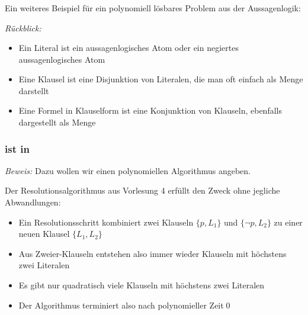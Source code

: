 \documentclass[aspectratio=1610,onlymath]{beamer}
\begin{document}
\begin{frame}\frametitle{}

Ein weiteres Beispiel für ein polynomiell lösbares Problem aus der Aussagenlogik:
\bigskip

\emph{Rückblick:}
\begin{itemize}
\item Ein \alert{Literal} ist ein aussagenlogisches Atom oder ein negiertes aussagenlogisches Atom
\item Eine \alert{Klausel} ist eine Disjunktion von Literalen, die man oft einfach als Menge darstellt
\item Eine Formel in \alert{Klauselform} ist eine Konjunktion von Klauseln,
ebenfalls dargestellt als Menge
\end{itemize}\pause


\end{frame}

\begin{frame}\frametitle{ ist in }


\pause\emph{Beweis:} Dazu wollen wir einen polynomiellen Algorithmus angeben.
\pause\bigskip

Der Resolutionsalgorithmus aus Vorlesung 4 erfüllt den Zweck ohne jegliche Abwandlungen:
\begin{itemize}
\item Ein Resolutionsschritt kombiniert zwei Klauseln $\{p,L_1\}$ und $\{\neg p,L_2\}$
zu einer neuen Klausel $\{L_1,L_2\}$
\item Aus Zweier-Klauseln entstehen also immer wieder Klauseln mit höchstens zwei Literalen
\item Es gibt nur quadratisch viele Klauseln mit höchstens zwei Literalen
\item Der Algorithmus terminiert also nach polynomieller Zeit\qed
\end{itemize}

\end{frame}

\end{document}
